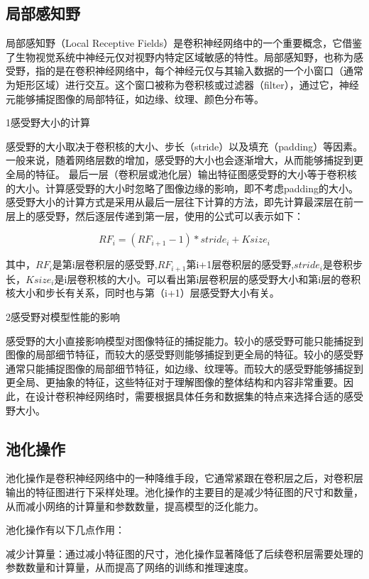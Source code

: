 \subsection{局部感知野}
局部感知野（Local Receptive Fields）是卷积神经网络中的一个重要概念，它借鉴了生物视觉系统中神经元仅对视野内特定区域敏感的特性。局部感知野，也称为感受野，指的是在卷积神经网络中，每个神经元仅与其输入数据的一个小窗口（通常为矩形区域）进行交互。这个窗口被称为卷积核或过滤器（filter），通过它，神经元能够捕捉图像的局部特征，如边缘、纹理、颜色分布等。

1感受野大小的计算

感受野的大小取决于卷积核的大小、步长（stride）以及填充（padding）等因素。一般来说，随着网络层数的增加，感受野的大小也会逐渐增大，从而能够捕捉到更全局的特征。
最后一层（卷积层或池化层）输出特征图感受野的大小等于卷积核的大小。计算感受野的大小时忽略了图像边缘的影响，即不考虑padding的大小。 感受野大小的计算方式是采用从最后一层往下计算的方法，即先计算最深层在前一层上的感受野，然后逐层传递到第一层，使用的公式可以表示如下：

\begin{equation}
	RF_i = (RF_{i+1}-1) *stride_i+Ksize_i
\end{equation}

其中，$RF_i$是第i层卷积层的感受野,$RF_{i+1}$第i+1层卷积层的感受野,$stride_i$是卷积步长，$Ksize_i$是i层卷积核的大小。可以看出第i层卷积层的感受野大小和第i层的卷积核大小和步长有关系，同时也与第（i+1）层感受野大小有关。 

2感受野对模型性能的影响

感受野的大小直接影响模型对图像特征的捕捉能力。较小的感受野可能只能捕捉到图像的局部细节特征，而较大的感受野则能够捕捉到更全局的特征。较小的感受野通常只能捕捉图像的局部细节特征，如边缘、纹理等。而较大的感受野能够捕捉到更全局、更抽象的特征，这些特征对于理解图像的整体结构和内容非常重要。因此，在设计卷积神经网络时，需要根据具体任务和数据集的特点来选择合适的感受野大小。

\subsection{池化操作}
池化操作是卷积神经网络中的一种降维手段，它通常紧跟在卷积层之后，对卷积层输出的特征图进行下采样处理。池化操作的主要目的是减少特征图的尺寸和数量，从而减小网络的计算量和参数数量，提高模型的泛化能力。

池化操作有以下几点作用：

减少计算量：通过减小特征图的尺寸，池化操作显著降低了后续卷积层需要处理的参数数量和计算量，从而提高了网络的训练和推理速度。

